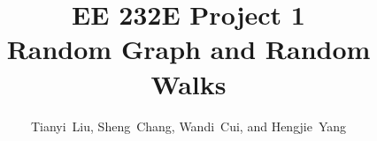 \documentclass[draftcls,12pt,onecolumn]{IEEEtran}
\begin{document}
%
\title{EE 232E Project 1 \\ Random Graph and Random Walks}
%
%
%

\author{Tianyi~Liu, 
        Sheng~Chang,
        Wandi~Cui,
        and Hengjie~Yang%
}

% 
%



% 
\end{document}

